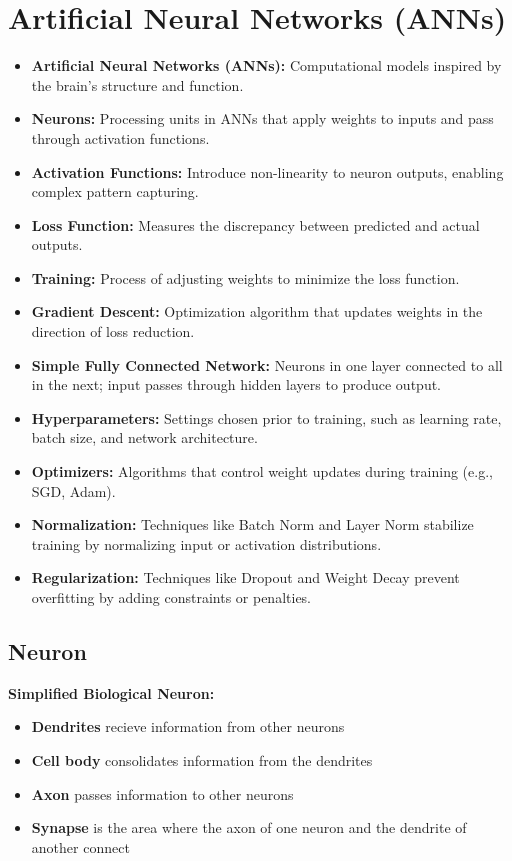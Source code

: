 \chapter{Artificial Neural Networks (ANNs)}
\begin{idea}
\begin{itemize}
\item \textbf{Artificial Neural Networks (ANNs):} Computational models inspired by the brain's structure and function.
\item \textbf{Neurons:} Processing units in ANNs that apply weights to inputs and pass through activation functions.
\item \textbf{Activation Functions:} Introduce non-linearity to neuron outputs, enabling complex pattern capturing.
\item \textbf{Loss Function:} Measures the discrepancy between predicted and actual outputs.
\item \textbf{Training:} Process of adjusting weights to minimize the loss function.
\item \textbf{Gradient Descent:} Optimization algorithm that updates weights in the direction of loss reduction.
\item \textbf{Simple Fully Connected Network:} Neurons in one layer connected to all in the next; input passes through hidden layers to produce output.
\item \textbf{Hyperparameters:} Settings chosen prior to training, such as learning rate, batch size, and network architecture.
\item \textbf{Optimizers:} Algorithms that control weight updates during training (e.g., SGD, Adam).
\item \textbf{Normalization:} Techniques like Batch Norm and Layer Norm stabilize training by normalizing input or activation distributions.
\item \textbf{Regularization:} Techniques like Dropout and Weight Decay prevent overfitting by adding constraints or penalties.
\end{itemize}
\end{idea}

\section{Neuron}

\textbf{Simplified Biological Neuron:}
\begin{itemize}
    \item \textbf{Dendrites} recieve information from other neurons
    \item \textbf{Cell body} consolidates information from the dendrites
    \item \textbf{Axon} passes information to other neurons
    \item \textbf{Synapse} is the area where the axon of one neuron and the dendrite of another connect
\end{itemize}

